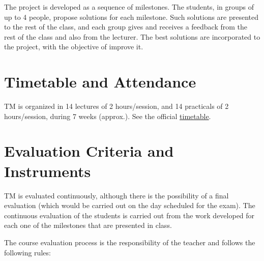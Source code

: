 The project is developed as a sequence of milestones. The students, in
groups of up to 4 people, propose solutions for each milestone. Such
solutions are presented to the rest of the class, and each group gives
and receives a feedback from the rest of the class and also from the
lecturer. The best solutions are incorporated to the project, with the
objective of improve it.

\section{Timetable and Attendance}

TM is organized in 14 lectures of 2 hours/session, and 14 practicals
of 2 hours/session, during 7 weeks (approx.). See the official
\href{https://www.ual.es/estudios/grados/presentacion/plandeestudios/asignatura/4015/40154321}{timetable}.

\section{Evaluation Criteria and Instruments}

TM is evaluated continuously, although there is the possibility of a
final evaluation (which would be carried out on the day scheduled for
the exam). The continuous evaluation of the students is carried out
from the work developed for each one of the milestones that are
presented in class.

The course evaluation process is the responsibility of the teacher and
follows the following rules:


